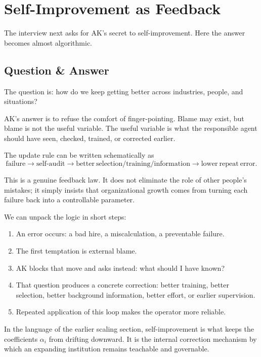 \section{Self-Improvement as Feedback}

The interview next asks for AK's secret to self-improvement. Here the answer becomes almost algorithmic.

\subsection{Question \& Answer}

The question is: how do we keep getting better across industries, people, and situations?

AK's answer is to refuse the comfort of finger-pointing. Blame may exist, but blame is not the useful variable. The useful variable is what the responsible agent should have seen, checked, trained, or corrected earlier.

The update rule can be written schematically as
\begin{equation}
\mathrm{failure}
\longrightarrow
\mathrm{self\mbox{-}audit}
\longrightarrow
\mathrm{better\ selection/training/information}
\longrightarrow
\mathrm{lower\ repeat\ error}.
\end{equation}

This is a genuine feedback law. It does not eliminate the role of other people's mistakes; it simply insists that organizational growth comes from turning each failure back into a controllable parameter.

We can unpack the logic in short steps:
\begin{enumerate}
\item An error occurs: a bad hire, a miscalculation, a preventable failure.
\item The first temptation is external blame.
\item AK blocks that move and asks instead: what should I have known?
\item That question produces a concrete correction: better training, better selection, better background information, better effort, or earlier supervision.
\item Repeated application of this loop makes the operator more reliable.
\end{enumerate}

In the language of the earlier scaling section, self-improvement is what keeps the coefficients \(\alpha_i\) from drifting downward. It is the internal correction mechanism by which an expanding institution remains teachable and governable.


